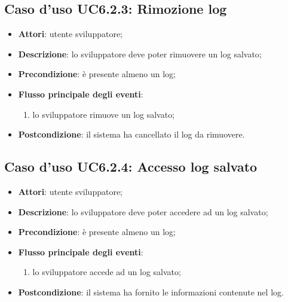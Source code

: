 \documentclass[../AnalisiDeiRequisiti.tex]{subfiles}
\begin{document}
\subsection{Caso d'uso UC6.2.3: Rimozione log}
\begin{itemize}
	\item \textbf{Attori}: utente sviluppatore;
	\item \textbf{Descrizione}: lo sviluppatore deve poter rimuovere un log salvato; 
	\item \textbf{Precondizione}: è presente almeno un log;
	
	\item \textbf{Flusso principale degli eventi}:
	\begin{enumerate}
		\item lo sviluppatore rimuove un log salvato;
		
	\end{enumerate}
	\item \textbf{Postcondizione}: il sistema ha cancellato il log da rimuovere.
\end{itemize}
\hypertarget{UC6.2.4}{}
\subsection{Caso d'uso UC6.2.4: Accesso log salvato}
\begin{itemize}
	\item \textbf{Attori}: utente sviluppatore;
	\item \textbf{Descrizione}: lo sviluppatore deve poter accedere ad un log salvato; 
	\item \textbf{Precondizione}: è presente almeno un log;
	
	\item \textbf{Flusso principale degli eventi}:
	\begin{enumerate}
		\item lo sviluppatore accede ad un log salvato;
		
	\end{enumerate}
	\item \textbf{Postcondizione}: il sistema ha fornito le informazioni contenute nel log.
\end{itemize}
\hypertarget{UC7}{}
\end{document}
